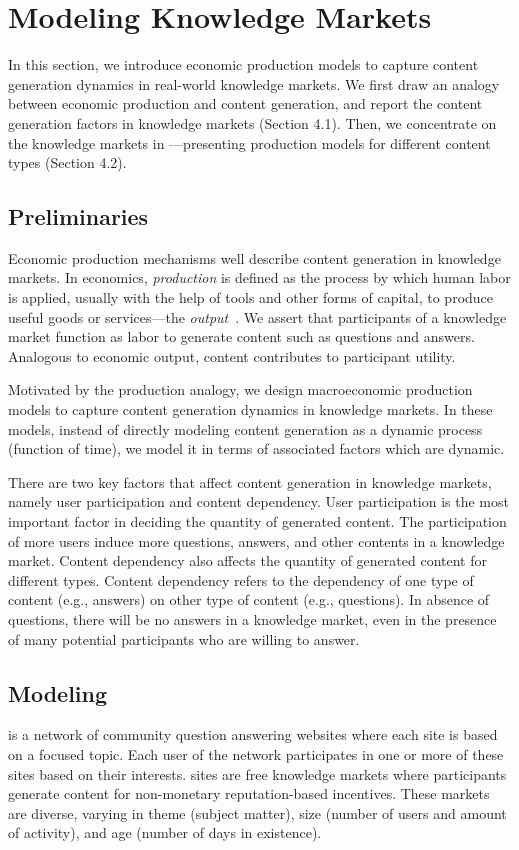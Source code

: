 \section{Modeling Knowledge Markets}
In this section, we introduce economic production models to capture content generation dynamics in real-world knowledge markets. We first draw an analogy between economic production and content generation, and report the content generation factors in knowledge markets (Section 4.1). Then, we concentrate on the knowledge markets in ---presenting production models for different content types (Section 4.2).

\subsection{Preliminaries} 
Economic production mechanisms well describe content generation in knowledge markets. In economics, \emph{production} is defined as the process by which human labor is applied, usually with the help of tools and other forms of capital, to produce useful goods or services---the \emph{output}~\cite{stanford2008economics}. We assert that participants of a knowledge market function as labor to generate content such as questions and answers. Analogous to economic output, content contributes to participant utility. 

Motivated by the production analogy, we design macroeconomic production models to capture content generation dynamics in knowledge markets. In these models, instead of directly modeling content generation as a dynamic process (function of time), we model it in terms of associated factors which are dynamic. 

There are two key factors that affect content generation in knowledge markets, namely user participation and content dependency. User participation is the most important factor in deciding the quantity of generated content. The participation of more users induce more questions, answers, and other contents in a knowledge market. Content dependency also affects the quantity of generated content for different types. Content dependency refers to the dependency of one type of content (e.g., answers) on other type of content (e.g., questions). In absence of questions, there will be no answers in a knowledge market, even in the presence of many potential participants who are willing to answer. 

\subsection{Modeling }
 is a network of community question answering websites where each site is based on a focused topic. Each user of the  network participates in one or more of these sites based on their interests.  sites are free knowledge markets where participants generate content for non-monetary reputation-based incentives. These markets are diverse, varying in theme (subject matter), size (number of users and amount of activity), and age (number of days in existence). 

